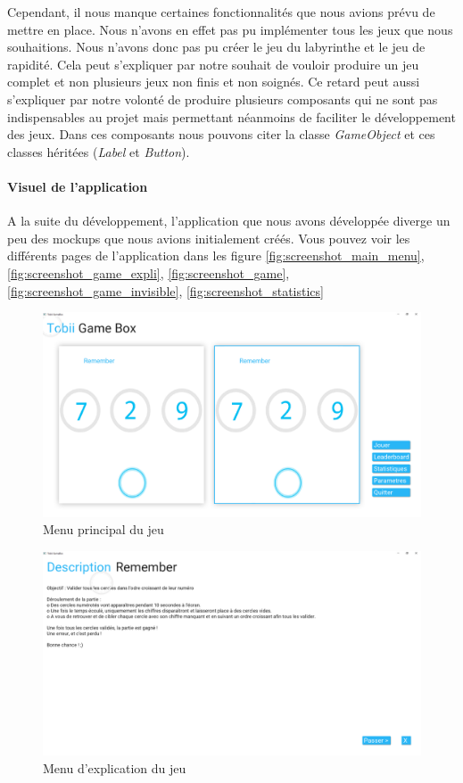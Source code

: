 \documentclass{polytech/polytech}
\begin{document}
Cependant, il nous manque certaines fonctionnalités que nous avions prévu de mettre en place. Nous n'avons en effet pas pu implémenter tous les jeux que nous souhaitions. Nous n'avons donc pas pu créer le jeu du labyrinthe et le jeu de rapidité. Cela peut s'expliquer par notre souhait de vouloir produire un jeu complet et non plusieurs jeux non finis et non soignés. Ce retard peut aussi s'expliquer par notre volonté de produire plusieurs composants qui ne sont pas indispensables au projet mais permettant néanmoins de faciliter le développement des jeux. Dans ces composants nous pouvons citer la classe \textit{GameObject} et ces classes héritées (\textit{Label} et \textit{Button}). 

\paragraph{Visuel de l'application}
A la suite du développement, l'application que nous avons développée diverge un peu des mockups que nous avions initialement créés. Vous pouvez voir les différents pages de l'application dans les figure \autoref{fig:screenshot_main_menu}, \autoref{fig:screenshot_game_expli}, \autoref{fig:screenshot_game}, \autoref{fig:screenshot_game_invisible}, \autoref{fig:screenshot_statistics}

\begin{figure}
    \centering
    \includegraphics[width=15cm]{img/screenshots/menu_principal.PNG}
    \caption{Menu principal du jeu}
    \label{fig:screenshot_main_menu}
\end{figure}

\begin{figure}
    \centering
    \includegraphics[width=15cm]{img/screenshots/jeu_explication.PNG}
    \caption{Menu d'explication du jeu}
    \label{fig:screenshot_game_expli}
\end{figure}
\end{document}
